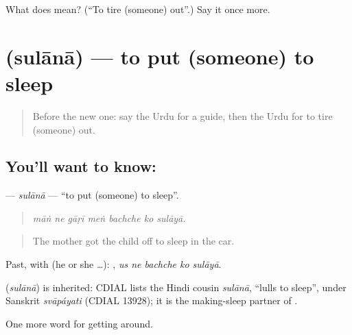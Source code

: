 \begin{tcolorbox}[breakable,colback=teal!4,colframe=teal!35!black,title={Before you move on}]
What does  mean? (\textquotedblleft{}To tire (someone) out\textquotedblright{}.) Say it once more.
\end{tcolorbox}
\section[\texorpdfstring{\ur{سلانا} (sulānā)}{سلانا (sulānā)}]{ (sulānā) — to put (someone) to sleep}

\label{lesson:UR-C402-sulana}



\begin{quote}
Before the new one: say the Urdu for a guide, then the Urdu for to tire (someone) out.
\end{quote}

\subsection*{You'll want to know: }
\textbf{} — \emph{sulānā} — \textquotedblleft{}to put (someone) to sleep\textquotedblright{}.

\begin{quote}
      
\end{quote}

\begin{quote}
\emph{māṅ ne gāṛī meṅ bachche ko sulāyā.}
\end{quote}

\begin{quote}
The mother got the child off to sleep in the car.
\end{quote}

Past, with  (he or she …):     , \emph{us ne bachche ko sulāyā}.

\begin{cousinweb}
\textbf{} (\emph{sulānā}) is inherited: CDIAL lists the Hindi cousin \emph{sulānā}, \textquotedblleft{}lulls to sleep\textquotedblright{}, under Sanskrit \emph{svāpáyati} (CDIAL 13928); it is the making-sleep partner of \textbf{}.
\end{cousinweb}

\begin{grammarlens}[title={What you've built}]
One more word for getting around.
\end{grammarlens}

